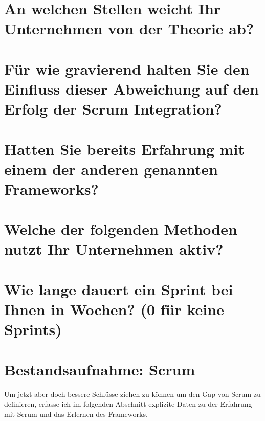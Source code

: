 \section*{An welchen Stellen weicht Ihr Unternehmen von der Theorie ab?}
\langantwort

\section*{Für wie gravierend halten Sie den Einfluss dieser Abweichung auf den Erfolg der Scrum Integration?}

\section*{Hatten Sie bereits Erfahrung mit einem der anderen genannten Frameworks?}

\section*{Welche der folgenden Methoden nutzt Ihr Unternehmen aktiv?}

\section*{Wie lange dauert ein Sprint bei Ihnen in Wochen? (0 für keine Sprints)}

\section*{Bestandsaufnahme: Scrum}
Um jetzt aber doch bessere Schlüsse ziehen zu können um den Gap von Scrum zu definieren, erfasse ich im folgenden Abschnitt explizite Daten zu der Erfahrung mit Scrum und das Erlernen des Frameworks.

